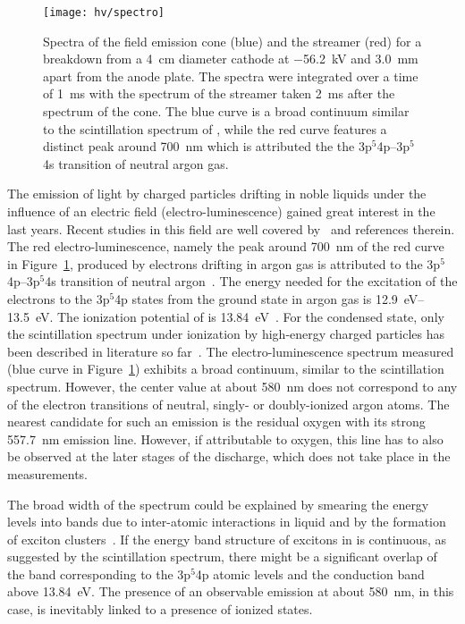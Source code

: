 \begin{figure}[htb]
	\centering
	\texttt{[image: hv/spectro]}
	\caption{Spectra of the field emission cone (blue) and the streamer (red) for a breakdown from a \SI{4}{\centi\metre} diameter cathode at \SI{-56.2}{\kilo\volt} and \SI{3.0}{\milli\metre} apart from the anode plate. The spectra were integrated over a time of \SI{1}{\milli\second} with the spectrum of the streamer taken \SI{2}{\milli\second} after the spectrum of the cone. The blue curve is a broad continuum similar to the scintillation spectrum of \lar{}, while the red curve features a distinct peak around \SI{700}{\nano\metre} which is attributed the the 3p$^5$4p--3p$^5$4s transition of neutral argon gas.}
	\label{fig:hv_spectro}
\end{figure}

The emission of light by charged particles drifting in noble liquids under the influence of an electric field (electro-luminescence) gained great interest in the last years.
Recent studies in this field are well covered by~\cite{buzulutskov1, buzulutskov2, buzulutskov3} and references therein.
The red electro-luminescence, namely the peak around \SI{700}{\nano\metre} of the red curve in Figure~\ref{fig:hv_spectro}, produced by electrons drifting in argon gas is attributed to the 3p$^5$4p--3p$^5$4s transition of neutral argon~\cite{Boffard}.
The energy needed for the excitation of the electrons to the 3p$^5$4p states from the ground state in argon gas is \SIrange{12.9}{13.5}{\electronvolt}.
The ionization potential of \lar{} is \SI{13.84}{\electronvolt}~\cite{2photonAbs}.
For the condensed state, only the scintillation spectrum under ionization by high-energy charged particles has been described in literature so far~\cite{Heindl}.
The electro-luminescence spectrum measured (blue curve in Figure~\ref{fig:hv_spectro}) exhibits a broad continuum, similar to the scintillation spectrum.
However, the center value at about \SI{580}{\nano\metre} does not correspond to any of the electron transitions of neutral, singly- or doubly-ionized argon atoms.
The nearest candidate for such an emission is the residual oxygen with its strong \SI{557.7}{\nano\metre} emission line.
However, if attributable to oxygen, this line has to also be observed at the later stages of the discharge, which does not take place in the measurements.

The broad width of the spectrum could be explained by smearing the energy levels into bands due to inter-atomic interactions in liquid and by the formation of exciton clusters~\cite{Bernstorff, Foerstel}.
If the energy band structure of excitons in \lar{} is continuous, as suggested by the scintillation spectrum, there might be a significant overlap of the band corresponding to the 3p$^5$4p atomic levels and the conduction band above \SI{13.84}{\electronvolt}.
The presence of an observable emission at about \SI{580}{\nano\metre}, in this case, is inevitably linked to a presence of ionized states.

